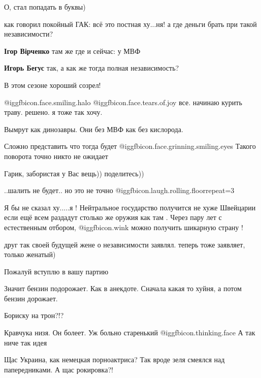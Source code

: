 \begin{itemize}
О, стал попадать в буквы)

как говорил покойный ГАК: всё это постная ху...ня!
а где деньги брать при такой независимости?

\begin{itemize} %
\textbf{Ігор Вірченко} там же где и сейчас: у МВФ

\textbf{Игорь Бегус} так, а как же тогда полная независимость?
\end{itemize} %

В этом сезоне хороший созрел!

 @igg{fbicon.face.smiling.halo}  @igg{fbicon.face.tears.of.joy} все. начинаю курить траву. решено. я тоже так хочу.

Вымрут как динозавры. Они без МВФ как без кислорода.

Сложно представить что тогда будет @igg{fbicon.face.grinning.smiling.eyes}  Такого поворота точно никто не ожидает

Гарик, забористая у Вас вещь)) поделитесь))

..шалить не будет..
но это не точно  @igg{fbicon.laugh.rolling.floor}{repeat=3} 


Я бы не сказал ху.....я ! Нейтральное государство получится не хуже Швейцарии
если ещё всем раздадут столько же оружия как там . Через пару лет с
естественным отбором,  @igg{fbicon.wink} можно получить шикарную страну !

друг так своей будущей жене о независимости заявлял. теперь тоже заявляет, только женатый)

Пожалуй вступлю в вашу партию

Значит бензин подорожает.
Как в анекдоте.
Сначала какая то хуйня, а потом бензин дорожает.


Бориску на трон?!?

Кравчука низя. Он болеет. Уж больно старенький  @igg{fbicon.thinking.face}  А так ниче так идея


Щас Украина, как немецкая порноактриса? Так вроде зеля смеялся над
папередниками. А щас рокировка?!


\end{itemize}
